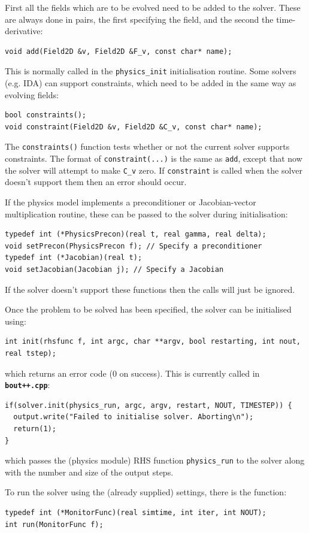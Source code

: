 \documentclass[12pt]{article}
\newcommand{\code}[1]{\texttt{#1}}
\newcommand{\file}[1]{\texttt{\bf #1}}
\begin{document}
First all the fields which are to be evolved need to be added
to the solver. These are always done in pairs, the first
specifying the field, and the second the time-derivative:
\begin{lstlisting}
void add(Field2D &v, Field2D &F_v, const char* name);
\end{lstlisting}
This is normally called in the \code{physics\_init} initialisation routine.
Some solvers (e.g. IDA) can support constraints, which need to be added
in the same way as evolving fields:
\begin{lstlisting}
bool constraints();
void constraint(Field2D &v, Field2D &C_v, const char* name);
\end{lstlisting}
The \code{constraints()} function tests whether or not the current
solver supports constraints. The format of \code{constraint(...)} is
the same as \code{add}, except that now the solver will attempt to make
\code{C\_v} zero. If \code{constraint} is called when the solver doesn't
support them then an error should occur.

If the physics model implements a preconditioner or Jacobian-vector
multiplication routine, these can be passed to the solver during
initialisation:
\begin{lstlisting}
typedef int (*PhysicsPrecon)(real t, real gamma, real delta);
void setPrecon(PhysicsPrecon f); // Specify a preconditioner
typedef int (*Jacobian)(real t);
void setJacobian(Jacobian j); // Specify a Jacobian
\end{lstlisting}
If the solver doesn't support these functions then the calls 
will just be ignored.

Once the problem to be solved has been specified, the solver can be
initialised using:
\begin{lstlisting}
int init(rhsfunc f, int argc, char **argv, bool restarting, int nout, real tstep);
\end{lstlisting}
which returns an error code (0 on success). This is currently
called in \file{bout++.cpp}:
\begin{lstlisting}
if(solver.init(physics_run, argc, argv, restart, NOUT, TIMESTEP)) {
  output.write("Failed to initialise solver. Aborting\n");
  return(1);
}
\end{lstlisting}
which passes the (physics module) RHS function \code{physics\_run}
to the solver along with the number and size of the output steps.

To run the solver using the (already supplied) settings, there is
the function:
\begin{lstlisting}
typedef int (*MonitorFunc)(real simtime, int iter, int NOUT);
int run(MonitorFunc f);
\end{lstlisting}
\end{document}

